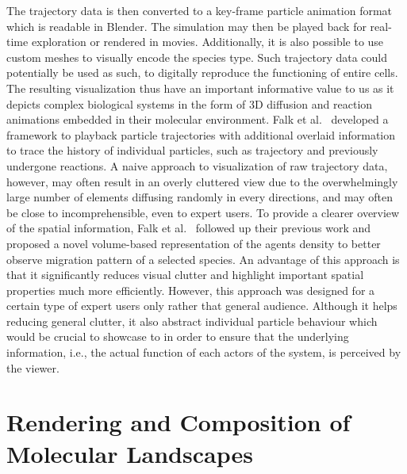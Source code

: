 The trajectory data is then converted to a key-frame particle animation format which is readable in Blender.
The simulation may then be played back for real-time exploration or rendered in movies.
Additionally, it is also possible to use custom meshes to visually encode the species type.
Such trajectory data could potentially be used as such, to digitally reproduce the functioning of entire cells.
The resulting visualization thus have an important informative value to us as it depicts complex biological systems in the form of 3D diffusion and reaction animations embedded in their molecular environment.
Falk et al.~\cite{falk2009visualization} developed a framework to playback particle trajectories with additional overlaid information to trace the history of individual particles, such as trajectory and previously undergone reactions.
A naive approach to visualization of raw trajectory data, however, may often result in an overly cluttered view due to the overwhelmingly large number of elements diffusing randomly in every directions, and may often be close to incomprehensible, even to expert users.
To provide a clearer overview of the spatial information, Falk et al.~\cite{falk20103d} followed up their previous work and proposed a novel volume-based representation of the agents density to better observe migration pattern of a selected species.
An advantage of this approach is that it significantly reduces visual clutter and highlight important spatial properties much more efficiently.
However, this approach was designed for a certain type of expert users only rather that general audience.
Although it helps reducing general clutter, it also abstract individual particle behaviour which would be crucial to showcase to in order to ensure that the underlying information, i.e., the actual function of each actors of the system, is perceived by the viewer.

\section{Rendering and Composition of Molecular Landscapes}

